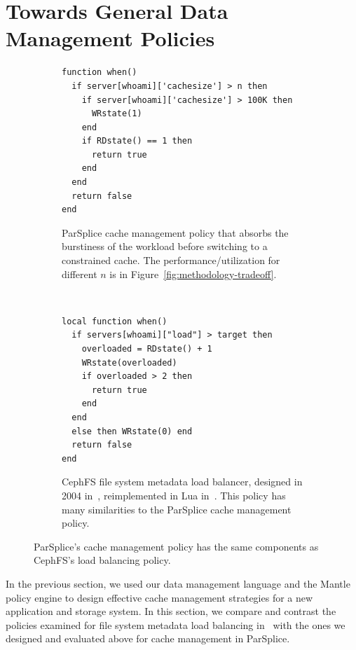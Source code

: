 \section{Towards General Data Management Policies}
\label{sec:scope}

\begin{figure}[t!]
    \centering
    \begin{subfigure}[t]{0.48\textwidth}
        \centering
        \footnotesize
        \centering
        \begin{verbatim}
function when()
  if server[whoami]['cachesize'] > n then
    if server[whoami]['cachesize'] > 100K then
      WRstate(1)
    end
    if RDstate() == 1 then
      return true
    end
  end
  return false
end
        \end{verbatim}
        \caption{ParSplice cache management policy that absorbs the burstiness of the
        workload before switching to a constrained cache.  The
        performance/utilization for different  \(n\) is in
        Figure~\ref{fig:methodology-tradeoff}. \label{src:lru-dyn}}
    \end{subfigure}%
    ~ 
    \begin{subfigure}[t]{0.48\textwidth}
        \centering
        \footnotesize
        \begin{verbatim}
local function when()
  if servers[whoami]["load"] > target then
    overloaded = RDstate() + 1
    WRstate(overloaded)
    if overloaded > 2 then
      return true
    end
  end
  else then WRstate(0) end
  return false
end
        \end{verbatim}
	\caption{CephFS file system metadata load balancer, designed in 2004
        in~\cite{weil:sc2004-dyn-metadata}, reimplemented in Lua
        in~\cite{sevilla:sc15-mantle}. This policy has many similarities to the
        ParSplice cache management policy.\label{src:lua-cephfs}}
    \end{subfigure}
    \caption{ParSplice's cache management policy has the same components as
    CephFS's load balancing policy.}
\end{figure}

In the previous section, we used our data management language and the Mantle
policy engine to design effective cache management strategies for a new
application and storage system. In this section, we compare and contrast the
policies examined for file system metadata load balancing
in~\cite{sevilla:sc15-mantle} with the ones we designed and evaluated above for
cache management in ParSplice. 

